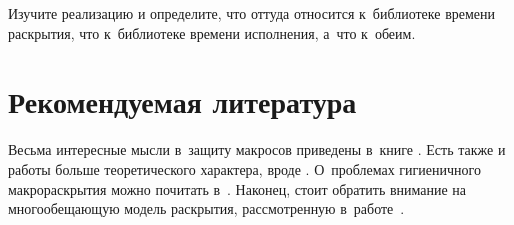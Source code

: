 \begin{exercise}\label{macros/ex:study}
Изучите реализацию {\Meroonet}  и определите, что
оттуда относится к~библиотеке времени раскрытия, что к~библиотеке времени
исполнения, а~что к~обеим.
\end{exercise}


\section*{Рекомендуемая литература}\label{macros/sect:recommended-reading}

Весьма интересные мысли в~защиту макросов приведены в~книге \cite{gra93}. Есть
также и работы больше теоретического характера, вроде \cite{qp90}. О~проблемах
гигиеничного макрораскрытия можно почитать в~\cite{kffd86,dfh88,cr91a,qp91b}.
Наконец, стоит обратить внимание на многообещающую модель раскрытия,
рассмотренную в~работе~\cite{dm95}.
